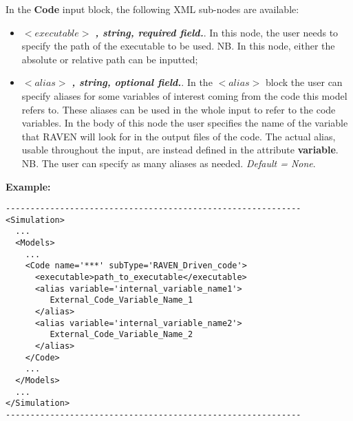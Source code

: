 In the \textbf{Code} input block, the following XML sub-nodes are available:
\begin{itemize}
   \item $<executable>$ \textbf{\textit{, string, required field.}}. In this node, the user needs to specify the path of the executable to be used. NB. In this node, either the absolute or relative path can be inputted;
    \item $<alias>$ \textbf{\textit{, string, optional field.}}. In the $<alias>$ block the user can specify aliases for some variables of interest coming from the code this model refers to. These aliases can be used in the whole input to refer to the code variables. In the body of this node the user specifies the name of the variable that RAVEN will look for in the output files of the code. The actual alias, usable throughout the input, are instead defined in the attribute \textbf{variable}.
 NB. The user can specify as many aliases as needed. \textit{Default = None}. 
\end{itemize}
\textbf{Example:}
\begin{lstlisting}[style=XML]
------------------------------------------------------------
<Simulation>
  ...
  <Models>
    ...
    <Code name='***' subType='RAVEN_Driven_code'>
      <executable>path_to_executable</executable>
      <alias variable='internal_variable_name1'>
         External_Code_Variable_Name_1
      </alias>
      <alias variable='internal_variable_name2'>
         External_Code_Variable_Name_2
      </alias>
    </Code>
    ...
  </Models>
  ...
</Simulation>
------------------------------------------------------------
\end{lstlisting}


